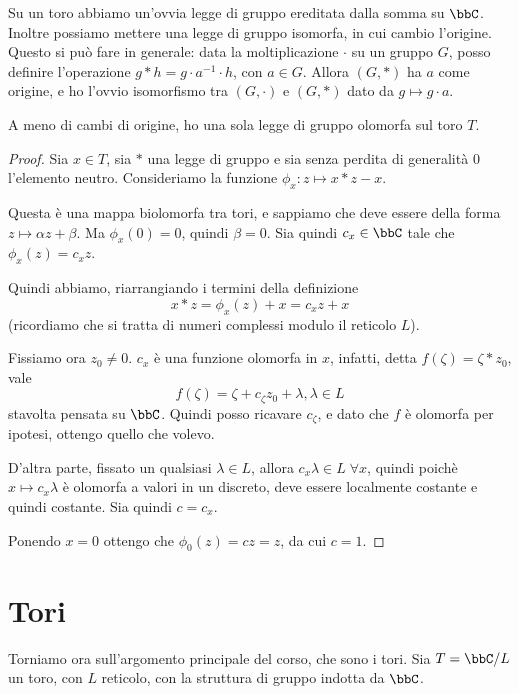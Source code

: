 	Su un toro abbiamo un'ovvia legge di gruppo ereditata dalla somma su $\bbC$. Inoltre possiamo mettere una legge di gruppo isomorfa, in cui cambio l'origine. Questo si può fare in generale: data la moltiplicazione $\cdot$ su un gruppo $G$, posso definire l'operazione $g * h = g\cdot a^{-1}\cdot h$, con $a\in G$. Allora $(G,*)$ ha $a$ come origine, e ho l'ovvio isomorfismo tra $(G,\cdot)$ e $(G,*)$ dato da $g\mapsto g\cdot a$.
	
	\begin{proposizione}
		A meno di cambi di origine, ho una sola legge di gruppo olomorfa sul toro $T$.
	\end{proposizione}
	
	\begin{proof}
		Sia $x \in T$, sia $*$ una legge di gruppo e sia senza perdita di generalità $0$ l'elemento neutro. Consideriamo la funzione $\phi_x: z \mapsto x * z - x$.

		Questa è una mappa biolomorfa tra tori, e sappiamo che deve essere della forma $z \mapsto \alpha z + \beta$. Ma $\phi_x(0)=0$, quindi $\beta=0$. Sia quindi $c_x \in \bbC$ tale che $\phi_x(z)=c_xz$.
		
		Quindi abbiamo, riarrangiando i termini della definizione 
		\[
		 x*z = \phi_x(z) + x = c_xz + x
		\]
		(ricordiamo che si tratta di numeri complessi modulo il reticolo $L$).
		
		Fissiamo ora $z_0\ne 0$. $c_x$ è una funzione olomorfa in $x$, infatti, detta $f(\zeta) = \zeta * z_0$, vale
		\[
			f(\zeta) = \zeta + c_\zeta z_0 + \lambda, \lambda \in L
		\]
		stavolta pensata su $\bbC$. Quindi posso ricavare $c_\zeta$, e dato che $f$ è olomorfa per ipotesi, ottengo quello che volevo.
		
		D'altra parte, fissato un qualsiasi $\lambda \in L$, allora $c_x\lambda \in L \; \forall x$, quindi poichè $x \mapsto c_x \lambda$ è olomorfa a valori in un discreto, deve essere localmente costante e quindi costante. Sia quindi $c=c_x$.
		
		Ponendo $x=0$ ottengo che $\phi_0(z) = cz = z$, da cui $c=1$.


	\end{proof}

	
	\section{Tori}
	
	Torniamo ora sull'argomento principale del corso, che sono i tori. Sia $T = \bbC / L$ un toro, con $L$ reticolo, con la struttura di gruppo indotta da $\bbC$.
	
